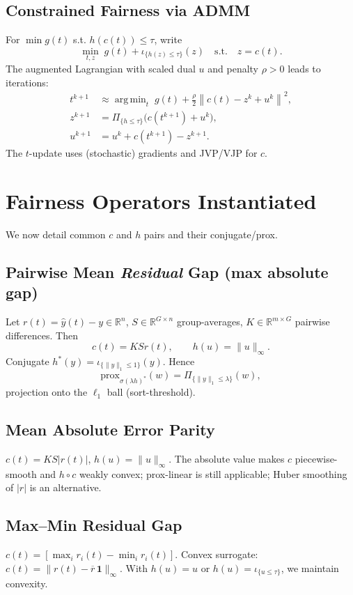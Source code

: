 \documentclass[11pt]{article}
\theoremstyle{plain}
\theoremstyle{definition}
\newcommand{\R}{\mathbb{R}}
\newcommand{\prox}{\mathrm{prox}}
\newcommand{\argmin}{\mathop{\mathrm{arg\,min}}}
\newcommand{\norm}[1]{\left\lVert #1 \right\rVert}
\newcommand{\1}{\mathbf{1}}
\newcommand{\indC}[1]{\iota_{#1}}
\begin{document}
\subsection{Constrained Fairness via ADMM}
For $\min g(t)$ s.t. $h(c(t))\le \tau$, write
\[
 \min_{t,z}\; g(t)+\indC{\{h(z)\le \tau\}}(z)\quad\text{s.t.}\quad z=c(t).
\]
The augmented Lagrangian with scaled dual $u$ and penalty $\rho>0$ leads to iterations:
\begin{align*}
 t^{k+1}&\approx \argmin_t \; g(t)+\frac{\rho}{2}\norm{c(t)-z^k+u^k}^2,\\
 z^{k+1}&=\Pi_{\{h\le\tau\}}\big(c(t^{k+1})+u^k\big),\\
 u^{k+1}&=u^k + c(t^{k+1})-z^{k+1}.
\end{align*}
The $t$-update uses (stochastic) gradients and JVP/VJP for $c$.

\section{Fairness Operators Instantiated}
We now detail common $c$ and $h$ pairs and their conjugate/prox.

\subsection{Pairwise Mean \emph{Residual} Gap (max absolute gap)}
Let $r(t)=\hat y(t)-y\in\R^n$, $S\in\R^{G\times n}$ group-averages, $K\in\R^{m\times G}$ pairwise differences. Then
\[
 c(t)=K S r(t), \qquad h(u)=\|u\|_\infty.
\]
Conjugate $h^*(y)=\indC{\{\|y\|_1\le 1\}}(y)$. Hence
\[
 \prox_{\sigma (\lambda h)^*}(w)=\Pi_{\{\|y\|_1\le \lambda\}}(w),
\]
projection onto the $\ell_1$ ball (sort-threshold).

\subsection{Mean Absolute Error Parity}
$c(t)=K S|r(t)|$, $h(u)=\|u\|_\infty$. The absolute value makes $c$ piecewise-smooth and $h\circ c$ weakly convex; prox-linear is still applicable; Huber smoothing of $|r|$ is an alternative.

\subsection{Max--Min Residual Gap}
$c(t)=[\max_i r_i(t)-\min_i r_i(t)]$. Convex surrogate: $c(t)=\|r(t)-\overline r \,\1\|_\infty$. With $h(u)=u$ or $h(u)=\indC{\{u\le \tau\}}$, we maintain convexity.
\end{document}
